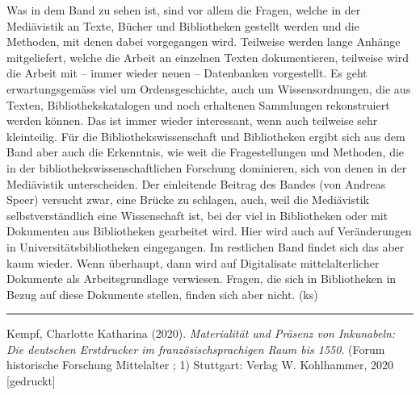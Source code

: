 \documentclass[a4paper,
fontsize=11pt,
oneside,
numbers=noperiodatend,
parskip=half-,
bibliography=totoc,
final
]{scrartcl}
\begin{document}
Was in dem Band zu sehen ist, sind vor allem die Fragen, welche in der
Mediävistik an Texte, Bücher und Bibliotheken gestellt werden und die
Methoden, mit denen dabei vorgegangen wird. Teilweise werden lange
Anhänge mitgeliefert, welche die Arbeit an einzelnen Texten
dokumentieren, teilweise wird die Arbeit mit -- immer wieder neuen --
Datenbanken vorgestellt. Es geht erwartungsgemäss viel um
Ordensgeschichte, auch um Wissensordnungen, die aus Texten,
Bibliothekskatalogen und noch erhaltenen Sammlungen rekonstruiert werden
können. Das ist immer wieder interessant, wenn auch teilweise sehr
kleinteilig. Für die Bibliothekswissenschaft und Bibliotheken ergibt
sich aus dem Band aber auch die Erkenntnis, wie weit die Fragestellungen
und Methoden, die in der bibliothekswissenschaftlichen Forschung
dominieren, sich von denen in der Mediävistik unterscheiden. Der
einleitende Beitrag des Bandes (von Andreas Speer) versucht zwar, eine
Brücke zu schlagen, auch, weil die Mediävistik selbstverständlich eine
Wissenschaft ist, bei der viel in Bibliotheken oder mit Dokumenten aus
Bibliotheken gearbeitet wird. Hier wird auch auf Veränderungen in
Universitätsbibliotheken eingegangen. Im restlichen Band findet sich das
aber kaum wieder. Wenn überhaupt, dann wird auf Digitalisate
mittelalterlicher Dokumente als Arbeitsgrundlage verwiesen. Fragen, die
sich in Bibliotheken in Bezug auf diese Dokumente stellen, finden sich
aber nicht. (ks)

\begin{center}\rule{0.5\linewidth}{0.5pt}\end{center}

\pagebreak
Kempf, Charlotte Katharina (2020). \emph{Materialität und Präsenz von
Inkunabeln: Die deutschen Erstdrucker im französischsprachigen Raum bis
1550}. (Forum historische Forschung Mittelalter ; 1) Stuttgart: Verlag
W. Kohlhammer, 2020 {[}gedruckt{]}
\end{document}
